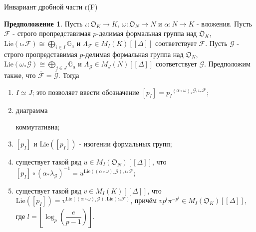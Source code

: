 \documentclass[a4paper,14pt]{extarticle}
\theoremstyle{definition}
\newtheorem{definition}{Определение}[section]
\newtheorem{guess}{Предположение}
\newcommand{\Lie}[1]{\mathrm{Lie}\left(#1\right)}
\newcommand{\nat}[3]{{#1}^{{\scriptscriptstyle #2, #3 }}}
\newcommand{\bG}{\mathbb{G}}
\newcommand{\fO}{\mathfrak{O}}
\newcommand{\sF}{\mathscr{F}}
\newcommand{\sG}{\mathscr{G}}
\newcommand{\Ga}{\bG_{\mathrm{a}}}
\begin{document}
\begin{section}{Инвариант дробной части r(F)}
\begin{guess}
    Пусть ${ \iota : \fO_K \rightarrow K }$, ${ \omega : \fO_N \rightarrow N }$ и ${ \alpha : N \rightarrow K }$ - вложения. Пусть $\sF$ - строго пропредставимая $p$-делимая формальная группа над $\fO_K$, ${ \Lie{\iota_* \sF} \cong \bigoplus\limits_{i \in I} \Ga }$ и ${ \Lambda_\sF \in M_I(K)[[\Delta]] }$ соответствует $\sF$. Пусть $\sG$ - строго пропредставимая $p$-делимая формальная группа над $\fO_N$, ${ \Lie{\omega_* \sG} \cong \bigoplus\limits_{j \in J} \Ga }$ и ${ \Lambda_\sG \in M_J(N)[[\Delta]] }$ соответствует $\sG$. Предположим также, что ${ \overline{\sF} = \overline{\sG} }$. Тогда
    \begin{enumerate}
        \item ${ I \simeq J }$; это позволяет ввести обозначение ${ [p_I] = \nat{p_I}{(\alpha \circ \omega)_* \sG}{\iota_* \sF} }$;
        \item диаграмма
        \begin{center}
        \end{center}
        коммутативна;
        \item $[p_I]$ и $\Lie{[p_I]}$ - изогении формальных групп;
        \item существует такой ряд ${ u \in M_I(\fO_N)[[\Delta]] }$, что ${ [p_I] \circ \left(\alpha_* \lambda_\sG\right)^{-1} = \nat{u}{\Lie{(\alpha \circ \omega)_* \sG}}{\iota_* \sF} }$;
        \item существует такой ряд ${ v \in M_I(K)[[\Delta]] }$, что ${ \Lie{[p_I]} = \nat{v}{\Lie{(\alpha \circ \omega)_* \sG}}{\Lie{\iota_* \sF}} }$, причём ${ v p^l \pi^{-p^l} \in M_I(\fO_K)[[\Delta]] }$, где ${ l = \left\lfloor \log_p\left( \dfrac{e}{p - 1} \right) \right\rfloor }$.
    \end{enumerate}
\end{guess}

\begin{comment}

\begin{definition}\label{def:4.1:r(F)}
    Пусть ${ \Lambda_F }$ соответствует формальному групповому закону $F$. \textit{Инвариант дробной части} группового закона $F$ определяется как ${ r(F) := \Lambda_F \mod M_m(R) }$. По определению, ${ r(F) \in M_m(K[[\Delta]]) / M_m(R) }$.
\end{definition}


\end{comment}
\end{section}
\end{document}
